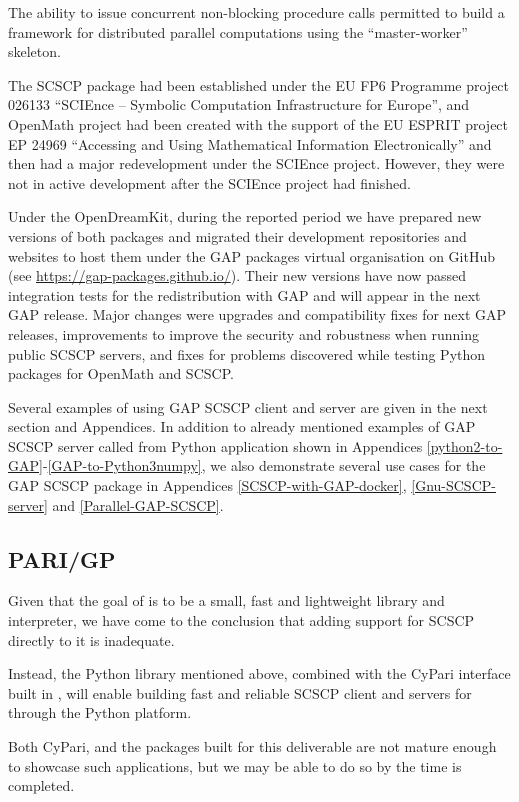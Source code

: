 \documentclass{deliverablereport}
\begin{document}
The ability to issue concurrent non-blocking procedure calls 
permitted to build a framework for distributed parallel computations
using the ``master-worker'' skeleton.

The SCSCP package had been established under the
EU FP6 Programme project 026133 
``SCIEnce -- Symbolic Computation Infrastructure for Europe'',
and OpenMath project had been created with the support of
the EU ESPRIT project EP 24969 
``Accessing and Using Mathematical Information Electronically''
and then had a major redevelopment under the SCIEnce project.
However, they were not in active development after the SCIEnce
project had finished.

Under the OpenDreamKit,
during the reported period we have prepared new versions of 
both packages and migrated their development repositories and
websites to host them under the GAP packages virtual organisation 
on GitHub (see \url{https://gap-packages.github.io/}).
Their new versions have now passed integration tests for the redistribution
with GAP and will appear in the next GAP release. Major changes
were upgrades and compatibility fixes for next GAP releases,
improvements to improve the security and robustness when
running public SCSCP servers, and fixes for problems discovered
while testing Python packages for OpenMath and SCSCP.

Several examples of using GAP SCSCP client and server are given
in the next section and Appendices. In addition to 
already mentioned examples of GAP SCSCP server called from
Python application shown in Appendices \ref{python2-to-GAP}-\ref{GAP-to-Python3numpy},
we also demonstrate several use cases for the GAP SCSCP package 
in Appendices \ref{SCSCP-with-GAP-docker}, \ref{Gnu-SCSCP-server}
and \ref{Parallel-GAP-SCSCP}.


\subsection{PARI/GP}

Given that the goal of \Pari is to be a small, fast and lightweight
library and interpreter, we have come to the conclusion that adding
support for SCSCP directly to it is inadequate.

Instead, the Python library mentioned above, combined with the CyPari
interface built in , will enable
building fast and reliable SCSCP client and servers for \Pari through
the Python platform.

Both CyPari, and the packages built for this deliverable are not
mature enough to showcase such applications, but we may be able to do
so by the time  is completed.
\end{document}
